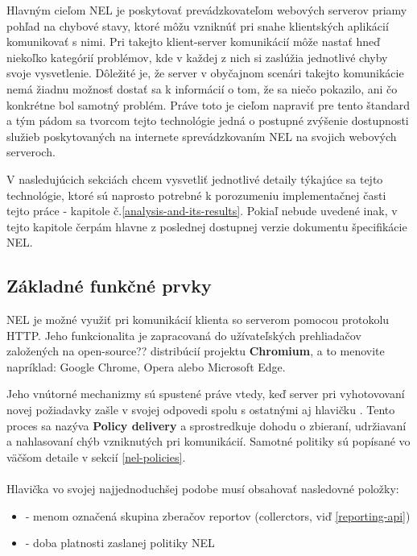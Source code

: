 Hlavným cieľom NEL je poskytovať prevádzkovateľom webových serverov priamy pohľad na chybové stavy, ktoré môžu vzniknúť pri snahe klientských aplikácií komunikovať s nimi. Pri takejto klient-server komunikácií môže nastať hneď niekoľko kategórií problémov, kde v každej z nich si zaslúžia jednotlivé chyby svoje vysvetlenie. Dôležité je, že server v obyčajnom scenári takejto komunikácie nemá žiadnu možnosť dostať sa k informácií o tom, že sa niečo pokazilo, ani čo konkrétne bol samotný problém. Práve toto je cieľom napraviť pre tento štandard a tým pádom sa tvorcom tejto technológie jedná o postupné zvýšenie dostupnosti služieb poskytovaných na internete sprevádzkovaním NEL na svojich webových serveroch.

V nasledujúcich sekciách chcem vysvetliť jednotlivé detaily týkajúce sa tejto technológie, ktoré sú naprosto potrebné k porozumeniu implementačnej časti tejto práce - kapitole č.\ref{analysis-and-its-results}. Pokiaľ nebude uvedené inak, v tejto kapitole čerpám hlavne z poslednej dostupnej verzie dokumentu špecifikácie NEL\cite{W3C-NEL}.


\subsection{Základné funkčné prvky}

NEL je možné využiť pri komunikácií klienta so serverom pomocou protokolu HTTP. Jeho funkcionalita je zapracovaná do užívateľských prehliadačov založených na open-source?? distribúcií projektu \textbf{Chromium}, a to menovite napríklad: Google Chrome, Opera alebo Microsoft Edge. 

Jeho vnútorné mechanizmy sú spustené práve vtedy, keď server pri vyhotovovaní novej požiadavky zašle v svojej odpovedi spolu s ostatnými aj hlavičku . Tento proces sa nazýva \textbf{Policy delivery} a sprostredkuje dohodu o zbieraní, udržiavaní a nahlasovaní chýb vzniknutých pri komunikácií. Samotné politiky sú popísané vo väčšom detaile v sekcií \ref{nel-policies}.
\\
\\
Hlavička  vo svojej najjednoduchšej podobe musí obsahovať nasledovné položky: 

\begin{itemize}
    \item {} - menom označená skupina zberačov reportov (collerctors, viď \ref{reporting-api}) 
    \item {} - doba platnosti zaslanej politiky NEL
\end{itemize}

